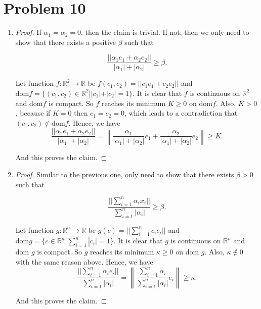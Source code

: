 \documentclass[12pt]{article}
\begin{document}
\section*{Problem 10}
\begin{enumerate}
\item
\begin{proof}

If $\alpha_1 = \alpha_2 = 0$, then the claim is trivial. If not, then we only need to show that there exists a positive $\beta $ such that

$$
\frac{||\alpha_1e_1 + \alpha_2e_2||}{|\alpha_1|+|\alpha_2|} \geqslant \beta.
$$

Let function $f:\mathbb{R}^2 \rightarrow \mathbb{R}$ be $f(c_1, c_2) = ||c_1e_1 + c_2e_2||$ and $\text{dom}f = \{(c_1, c_2)\in\mathbb{R}^2 | |c_1| + |c_2| = 1 \}$. It is clear that $f$ is continuous on $\mathbb R^2$ and dom$f$ is compact. So $f$ reaches its minimum $K\geqslant 0$ on dom$f$. Also, $K > 0$, because if $K = 0$ then $c_1 = c_2 = 0$, which leads to a contradiction that $(c_1, c_2) \notin \text{dom} f$. Hence, we have 
$$
\frac{||\alpha_1e_1 + \alpha_2e_2||}{|\alpha_1|+|\alpha_2|} = \left\| \frac{\alpha_1}{|\alpha_1| + |\alpha_2|}e_1 + \frac{\alpha_2}{|\alpha_1| + |\alpha_2|}e_2 \right\| \geqslant K.
$$

And this proves the claim.

\end{proof}

\item

\begin{proof}

Similar to the previous one, only need to show that there exists $\beta > 0$ such that
 
$$
\frac{||\sum_{i=1}^n \alpha_ix_i||}{\sum_{i=1}^n|\alpha_i|} \geqslant \beta.
$$

Let function $g:\mathbb{R}^n \rightarrow \mathbb{R}$ be $g(c) = ||\sum_{i=1}^n c_ie_i||$ and $\text{dom} g = \{c \in\mathbb{R}^n | \sum_{i=1}^n|c_i| = 1 \}$. It is clear that $g$ is continuous on $\mathbb R^n$ and dom $g$ is compact. So $g$ reaches its minimum $\kappa \geqslant 0$ on dom $g$. Also, $\kappa \notin 0$ with the same reason above. Hence, we have 
$$
\frac{||\sum_{i=1}^n \alpha_ie_i||}{\sum_{i=1}^n|\alpha_i|} = \left\|  \frac{\sum_{i=1}^n\alpha_i}{\sum_{i=1}^n |\alpha_i|}e_i \right\| \geqslant \kappa.
$$

And this proves the claim.


\end{proof}


\end{enumerate}
\end{document}
